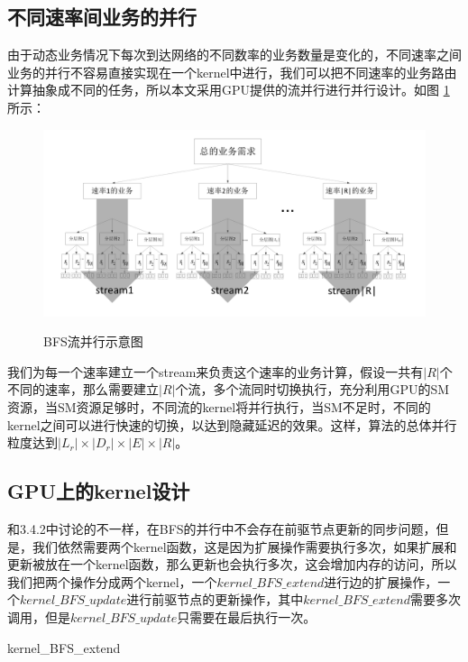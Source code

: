 \subsection{不同速率间业务的并行}
由于动态业务情况下每次到达网络的不同数率的业务数量是变化的，不同速率之间业务的并行不容易直接实现在一个kernel中进行，我们可以把不同速率的业务路由计算抽象成不同的任务，所以本文采用GPU提供的流并行进行并行设计。如图 \ref{bfssteam}所示：
\begin{figure}
\setlength{\belowcaptionskip}{-0.5cm}
\begin{center}
{\includegraphics[width=1 \textwidth]{figures/hbfs.pdf}}
\end{center}
\caption{{\footnotesize{BFS流并行示意图}}}
\label{bfssteam}
\end{figure}

我们为每一个速率建立一个stream来负责这个速率的业务计算，假设一共有$|R|$个不同的速率，那么需要建立$|R|$个流，多个流同时切换执行，充分利用GPU的SM资源，当SM资源足够时，不同流的kernel将并行执行，当SM不足时，不同的kernel之间可以进行快速的切换，以达到隐藏延迟的效果。这样，算法的总体并行粒度达到$|L_r|\times|D_r|\times|E|\times|R|$。

\subsection{GPU上的kernel设计}
和3.4.2中讨论的不一样，在BFS的并行中不会存在前驱节点更新的同步问题，但是，我们依然需要两个kernel函数，这是因为扩展操作需要执行多次，如果扩展和更新被放在一个kernel函数，那么更新也会执行多次，这会增加内存的访问，所以我们把两个操作分成两个kernel，一个$kernel\_BFS\_extend$进行边的扩展操作，一个$kernel\_BFS\_update$进行前驱节点的更新操作，其中$kernel\_BFS\_extend$需要多次调用，但是$kernel\_BFS\_update$只需要在最后执行一次。
\begin{algorithm}[t]
\begin{algorithmic}[1]
\EndIf
{}
\EndIf
\EndFunction
\end{algorithmic}
\caption{kernel\_BFS\_extend}
\label{KernelBFS}
\end{algorithm}


